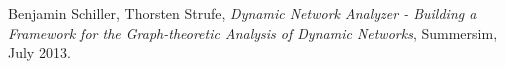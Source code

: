 \begin{thebibliography}{9}

  Benjamin Schiller, Thorsten Strufe,
  \emph{Dynamic Network Analyzer - Building a Framework for the Graph-theoretic Analysis of Dynamic Networks},
  Summersim,
  July 2013.

\end{thebibliography}